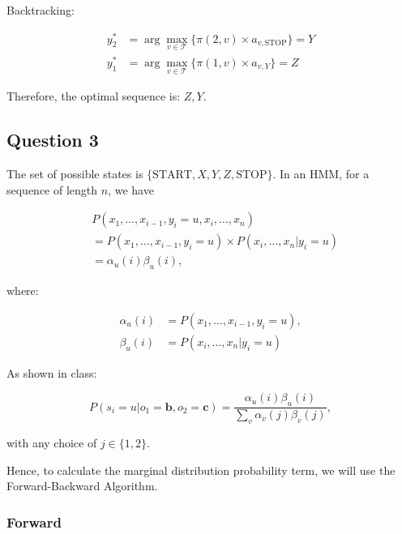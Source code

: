 \documentclass[11pt,fancychapters]{article}
\begin{document}
Backtracking:

\begin{align*}
	y_2^* &= \arg \max_{v \in \mathcal{T}} \{ \pi(2, v) \times a_{v, \text{STOP}} \} = Y \\
	y_1^* &= \arg \max_{v \in \mathcal{T}} \{ \pi(1, v) \times a_{v, Y} \} = Z
\end{align*}

Therefore, the optimal sequence is: $Z, Y$.

\subsection*{Question 3}

The set of possible states is $\{\text{START}, X, Y, Z, \text{STOP}\}$. In an HMM, for a sequence of length $n$, we have

\begin{align*}
	&P(x_1, \ldots, x_{i-1}, y_i = u, x_i, \ldots, x_n) \\
	&= P(x_1, \ldots, x_{i-1}, y_i = u) \times P(x_i, \ldots, x_n | y_i = u) \\
	&= \alpha_u(i) \beta_u(i),
\end{align*}

where:

\begin{align*}
	\alpha_u(i) &= P(x_1, \ldots, x_{i-1}, y_i = u), \\
	\beta_u(i) &= P(x_i, \ldots, x_n | y_i = u)
\end{align*}

As shown in class:

\begin{equation*}
	P(s_i = u | o_1 = \textbf{b}, o_2 = \textbf{c}) = \frac{\alpha_u(i) \beta_u(i)}{\sum_{v} \alpha_v(j) \beta_v(j)},
\end{equation*}

with any choice of $j \in \{1, 2\}$.

Hence, to calculate the marginal distribution probability term, we will use the Forward-Backward Algorithm.

\subsubsection*{Forward}
\end{document}
